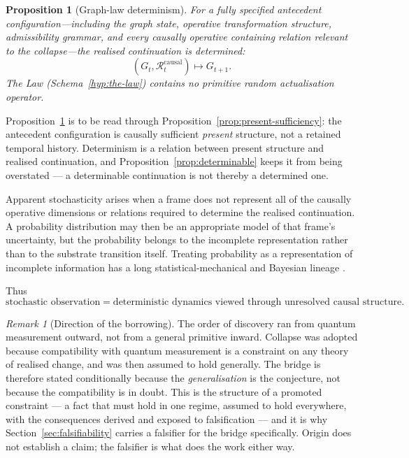 \documentclass[11pt,a4paper]{article}
\newtheorem{proposition}[definition]{Proposition}
\theoremstyle{remark}\newtheorem{remark}[definition]{Remark}
\begin{document}
\begin{proposition}[Graph-law determinism]\label{prop:determinism}
For a fully specified antecedent configuration---including the graph state, operative transformation structure, admissibility grammar, and every causally operative containing relation relevant to the collapse---the realised continuation is determined:
\[
\boxed{
\left(G_t,\mathcal R_t^{\mathrm{causal}}\right)
\mapsto
G_{t+1}.
}
\]
The Law (Schema~\ref{hyp:the-law}) contains no primitive random actualisation operator.
\end{proposition}

Proposition~\ref{prop:determinism} is to be read through Proposition~\ref{prop:present-sufficiency}: the antecedent configuration is causally sufficient \emph{present} structure, not a retained temporal history. Determinism is a relation between present structure and realised continuation, and Proposition~\ref{prop:determinable} keeps it from being overstated --- a determinable continuation is not thereby a determined one.

Apparent stochasticity arises when a frame does not represent all of the causally operative dimensions or relations required to determine the realised continuation. A probability distribution may then be an appropriate model of that frame's uncertainty, but the probability belongs to the incomplete representation rather than to the substrate transition itself. Treating probability as a representation of incomplete information has a long statistical-mechanical and Bayesian lineage \citep{jaynes1957}.

Thus
\[
\boxed{
\text{stochastic observation}
=
\text{deterministic dynamics viewed through unresolved causal structure}.
}
\]

\begin{remark}[Direction of the borrowing]\label{rem:qm-provenance}
The order of discovery ran from quantum measurement outward, not from a general primitive inward. Collapse was adopted because compatibility with quantum measurement is a constraint on any theory of realised change, and was then assumed to hold generally. The bridge is therefore stated conditionally because the \emph{generalisation} is the conjecture, not because the compatibility is in doubt. This is the structure of a promoted constraint --- a fact that must hold in one regime, assumed to hold everywhere, with the consequences derived and exposed to falsification --- and it is why Section~\ref{sec:falsifiability} carries a falsifier for the bridge specifically. Origin does not establish a claim; the falsifier is what does the work either way.
\end{remark}
\end{document}
